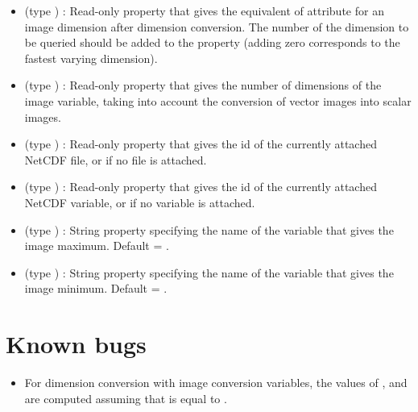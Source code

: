 \documentclass{article}
\begin{document}
\begin{itemize}
\item {} (type ) : Read-only
property that gives the equivalent of attribute  for an
image dimension after dimension conversion. The number of the
dimension to be queried should be added to the property (adding zero
corresponds to the fastest varying dimension). 

\item {} (type ) : Read-only property
that gives the number of dimensions of the image variable, taking into
account the conversion of vector images into scalar images.

\item {} (type ) : Read-only property
that gives the id of the currently attached NetCDF file, or
 if no file is attached.

\item {} (type ) : Read-only property
that gives the id of the currently attached NetCDF variable, or
 if no variable is attached.

\item {} (type ) : String property
specifying the name of the variable that gives the image maximum. 
Default = . 

\item {} (type ) : String property
specifying the name of the variable that gives the image minimum. 
Default = .

\end{itemize}

\section{Known bugs}

\begin{itemize}

\item For dimension conversion with image conversion variables, the
values of ,  and
 are computed assuming that
 is equal to . 

\end{itemize}
\end{document}
